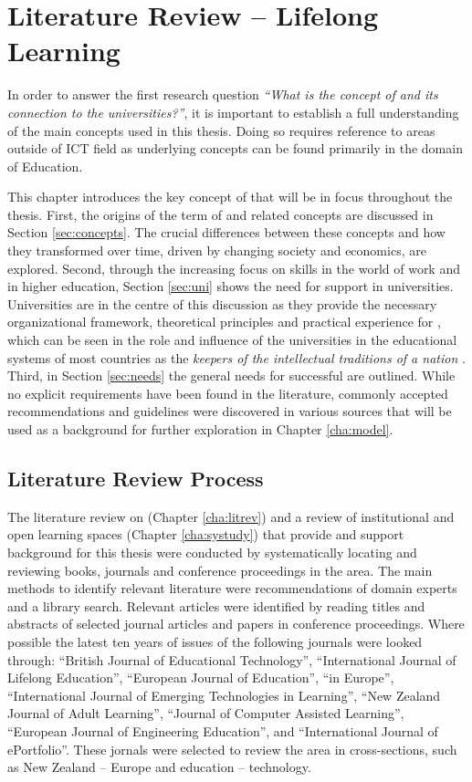 \chapter{Literature Review -- Lifelong Learning \label{cha:litrev}}
In order to answer the first research question \textit{``What is the concept of
\LLLs and its connection to the universities?''}, it is important to establish a
full understanding of the main concepts used in this thesis. Doing so requires 
reference to areas outside of ICT field as underlying concepts can be found
primarily in the domain of Education.

This chapter introduces the key concept of \LLLs that will be in focus
throughout the thesis. First, the origins of the term of \textit{\LLLsn} and
related concepts are discussed in Section \ref{sec:concepts}. The crucial
differences between these concepts and how they transformed over time, driven by
changing society and economics, are explored. Second, through the increasing
focus on \LLLs skills in the world of work and in higher education, Section
\ref{sec:uni} shows the need for \LLLs support in universities. Universities are
in the centre of this discussion as they provide the necessary organizational
framework, theoretical principles and practical experience for \LLLs
\citep{Knapper2000}, which can be seen in the role and influence of the
universities in the educational systems of most countries as the \textit{keepers
of the intellectual traditions of a nation} \citep[p.~96]{Longworth2003}. Third,
in Section \ref{sec:needs} the general needs for successful \LLLs are outlined.
While no explicit requirements have been found in the literature, commonly
accepted recommendations and guidelines were discovered in various sources that
will be used as a background for further exploration in Chapter \ref{cha:model}.

\section{Literature Review Process}
The literature review on \LLLs (Chapter \ref{cha:litrev}) and a review of
institutional and open learning spaces (Chapter \ref{cha:systudy}) that provide
and support background for this thesis were conducted by systematically locating
and reviewing books, journals and conference proceedings in the area. The main
methods to identify relevant literature were recommendations of domain experts
and a library search. Relevant articles were identified by reading titles and
abstracts of selected journal articles and papers in conference proceedings.
Where possible the latest ten years of issues of the following journals were
looked through: ``British Journal of Educational Technology'', ``International
Journal of Lifelong Education'', ``European Journal of Education'', ``\LLLc in
Europe'', ``International Journal of Emerging Technologies in Learning'', ``New
Zealand Journal of Adult Learning'', ``Journal of Computer Assisted Learning'',
``European Journal of Engineering Education'', and ``International Journal of
ePortfolio''. These jornals were selected to review the area in cross-sections,
such as New Zealand -- Europe and education -- technology.

